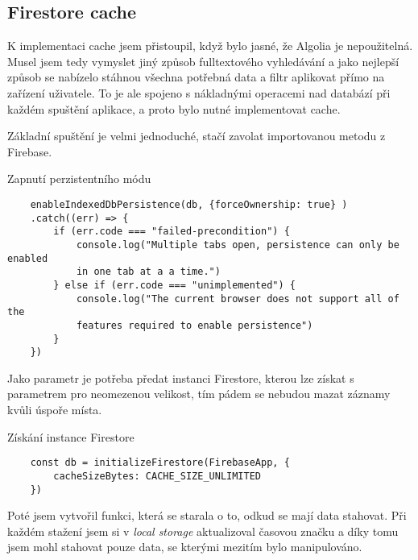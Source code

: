 \subsection{Firestore cache}
K implementaci cache jsem přistoupil, když bylo jasné, že Algolia je nepoužitelná. Musel jsem tedy vymyslet jiný způsob fulltextového
vyhledávání a jako nejlepší způsob se nabízelo stáhnou všechna potřebná data a filtr aplikovat přímo na zařízení uživatele. To je ale
spojeno s nákladnými operacemi nad databází při každém spuštění aplikace, a proto bylo nutné implementovat cache.

Základní spuštění je velmi jednoduché, stačí zavolat importovanou metodu z Firebase.

\begin{listing}[h]
    \caption{Zapnutí perzistentního módu}
    \begin{verbatim}
    enableIndexedDbPersistence(db, {forceOwnership: true} )
    .catch((err) => {
        if (err.code === "failed-precondition") {
            console.log("Multiple tabs open, persistence can only be enabled
            in one tab at a a time.")
        } else if (err.code === "unimplemented") {
            console.log("The current browser does not support all of the
            features required to enable persistence")
        }
    })
    \end{verbatim}
\end{listing}

Jako parametr je potřeba předat instanci Firestore, kterou lze získat s parametrem pro neomezenou velikost, tím pádem se nebudou
mazat záznamy kvůli úspoře místa.

\begin{listing}[h]
    \caption{Získání instance Firestore}
    \begin{verbatim}
    const db = initializeFirestore(FirebaseApp, {
        cacheSizeBytes: CACHE_SIZE_UNLIMITED
    })
    \end{verbatim}
\end{listing}

Poté jsem vytvořil funkci, která se starala o to, odkud se mají data stahovat. Při každém stažení jsem si v \emph{local storage} aktualizoval
časovou značku a díky tomu jsem mohl stahovat pouze data, se kterými mezitím bylo manipulováno.

